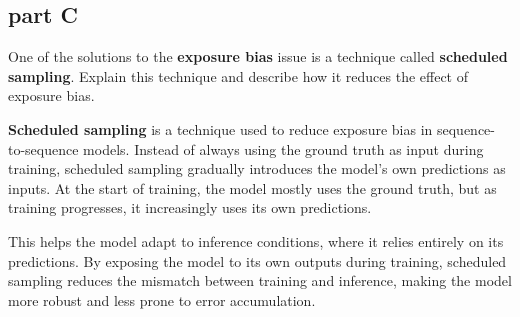 \subsection{part C}
One of the solutions to the \textbf{exposure bias} issue is a technique called \textbf{scheduled sampling}. Explain this technique and describe how it reduces the effect of exposure bias.
\begin{qsolve}
  \begin{qsolve}[]
    \textbf{Scheduled sampling} is a technique used to reduce exposure bias in sequence-to-sequence models. Instead of always using the ground truth as input during training, scheduled sampling gradually introduces the model's own predictions as inputs. At the start of training, the model mostly uses the ground truth, but as training progresses, it increasingly uses its own predictions.

    This helps the model adapt to inference conditions, where it relies entirely on its predictions. By exposing the model to its own outputs during training, scheduled sampling reduces the mismatch between training and inference, making the model more robust and less prone to error accumulation.
  \end{qsolve}
\end{qsolve}